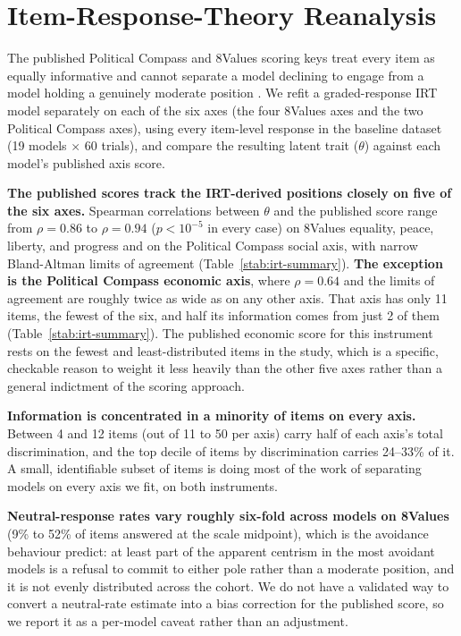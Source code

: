\documentclass[11pt]{article}
\begin{document}
\section{Item-Response-Theory Reanalysis}
\label{si:irt}

The published Political Compass and 8Values scoring keys treat every item
as equally informative and cannot separate a model declining to engage from
a model holding a genuinely moderate position \citep{wachter2025irt}. We
refit a graded-response IRT model separately on each of the six axes (the
four 8Values axes and the two Political Compass axes), using every
item-level response in the baseline dataset (19 models $\times$ 60 trials),
and compare the resulting latent trait ($\theta$) against each model's
published axis score.

\textbf{The published scores track the IRT-derived positions closely on
five of the six axes.} Spearman correlations between $\theta$ and the
published score range from $\rho=0.86$ to $\rho=0.94$ ($p<10^{-5}$ in every
case) on 8Values equality, peace, liberty, and progress and on the
Political Compass social axis, with narrow Bland-Altman limits of agreement
(Table~\ref{stab:irt-summary}). \textbf{The exception is the Political
Compass economic axis}, where $\rho=0.64$ and the limits of agreement are
roughly twice as wide as on any other axis. That axis has only 11 items,
the fewest of the six, and half its information comes from just 2 of them
(Table~\ref{stab:irt-summary}). The published economic score for this
instrument rests on the fewest and least-distributed items in the study,
which is a specific, checkable reason to weight it less heavily than the
other five axes rather than a general indictment of the scoring approach.

\textbf{Information is concentrated in a minority of items on every axis.}
Between 4 and 12 items (out of 11 to 50 per axis) carry half of each axis's
total discrimination, and the top decile of items by discrimination
carries 24--33\% of it. A small, identifiable subset of items is doing most
of the work of separating models on every axis we fit, on both instruments.

\textbf{Neutral-response rates vary roughly six-fold across models on
8Values} (9\% to 52\% of items answered at the scale midpoint), which is the
avoidance behaviour \citet{wachter2025irt} predict: at least part of the
apparent centrism in the most avoidant models is a refusal to commit to
either pole rather than a moderate position, and it is not evenly
distributed across the cohort. We do not have a validated way to convert a
neutral-rate estimate into a bias correction for the published score, so we
report it as a per-model caveat rather than an adjustment.
\end{document}
